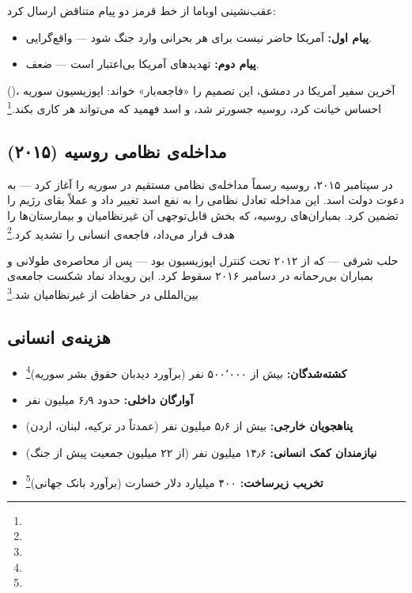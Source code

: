 \begin{tcolorbox}[wavebox, title={تحلیل: پارادوکس خط قرمز}]
عقب‌نشینی اوباما از خط قرمز دو پیام متناقض ارسال کرد:
\begin{itemize}
\item \textbf{پیام اول:} آمریکا حاضر نیست برای هر بحرانی وارد جنگ شود — واقع‌گرایی.
\item \textbf{پیام دوم:} تهدیدهای آمریکا بی‌اعتبار است — ضعف.
\end{itemize}
 ()، آخرین سفیر آمریکا در دمشق، این تصمیم را «فاجعه‌بار» خواند: اپوزیسیون سوریه احساس خیانت کرد، روسیه جسورتر شد، و اسد فهمید که می‌تواند هر کاری بکند.\footnote{}
\end{tcolorbox}

\subsection{مداخله‌ی نظامی روسیه (۲۰۱۵)}
\label{subsec:ch10-syria-russia}

در سپتامبر ۲۰۱۵، روسیه رسماً مداخله‌ی نظامی مستقیم در سوریه را آغاز کرد — به دعوت دولت اسد. این مداخله تعادل نظامی را به نفع اسد تغییر داد و عملاً بقای رژیم را تضمین کرد. بمباران‌های روسیه، که بخش قابل‌توجهی آن غیرنظامیان و بیمارستان‌ها را هدف قرار می‌داد، فاجعه‌ی انسانی را تشدید کرد.\footnote{}

حلب شرقی — که از ۲۰۱۲ تحت کنترل اپوزیسیون بود — پس از محاصره‌ی طولانی و بمباران بی‌رحمانه در دسامبر ۲۰۱۶ سقوط کرد. این رویداد نماد شکست جامعه‌ی بین‌المللی در حفاظت از غیرنظامیان شد.\footnote{}

\subsection{هزینه‌ی انسانی}
\label{subsec:ch10-syria-cost}

\begin{tcolorbox}[enemybox, title={فاجعه: آمار جنگ سوریه (تا ۲۰۲۳)}]
\begin{itemize}
\item \textbf{کشته‌شدگان:} بیش از ۵۰۰٬۰۰۰ نفر (برآورد دیدبان حقوق بشر سوریه)\footnote{}
\item \textbf{آوارگان داخلی:} حدود ۶٫۹ میلیون نفر
\item \textbf{پناهجویان خارجی:} بیش از ۵٫۶ میلیون نفر (عمدتاً در ترکیه، لبنان، اردن)
\item \textbf{نیازمندان کمک انسانی:} ۱۴٫۶ میلیون نفر (از ۲۲ میلیون جمعیت پیش از جنگ)
\item \textbf{تخریب زیرساخت:} ۴۰۰ میلیارد دلار خسارت (برآورد بانک جهانی)\footnote{}
\end{itemize}
\end{tcolorbox}


